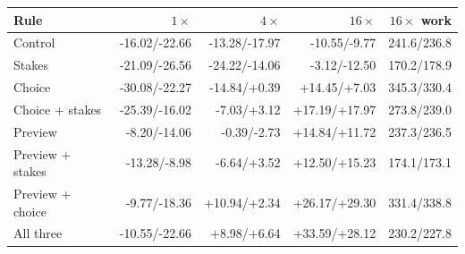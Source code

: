\begin{tabular}{lrrrr}
\toprule
Rule & $1\times$ & $4\times$ & $16\times$ & $16\times$ work \\
\midrule
Control & -16.02/-22.66 & -13.28/-17.97 & -10.55/-9.77 & 241.6/236.8 \\
Stakes & -21.09/-26.56 & -24.22/-14.06 & -3.12/-12.50 & 170.2/178.9 \\
Choice & -30.08/-22.27 & -14.84/+0.39 & +14.45/+7.03 & 345.3/330.4 \\
Choice + stakes & -25.39/-16.02 & -7.03/+3.12 & +17.19/+17.97 & 273.8/239.0 \\
Preview & -8.20/-14.06 & -0.39/-2.73 & +14.84/+11.72 & 237.3/236.5 \\
Preview + stakes & -13.28/-8.98 & -6.64/+3.52 & +12.50/+15.23 & 174.1/173.1 \\
Preview + choice & -9.77/-18.36 & +10.94/+2.34 & +26.17/+29.30 & 331.4/338.8 \\
All three & -10.55/-22.66 & +8.98/+6.64 & +33.59/+28.12 & 230.2/227.8 \\
\bottomrule
\end{tabular}
